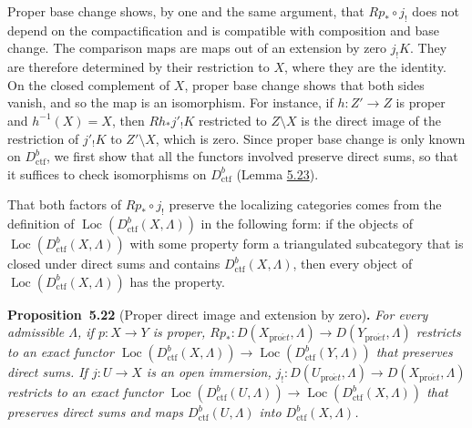 \documentclass[11pt]{article}
\newenvironment{bpstatement}[2]{\par\addvspace{0.6\baselineskip}\noindent\textbf{#1}#2\textbf{.}\enspace\ignorespaces}
  {\par\addvspace{0.4\baselineskip}}
\newenvironment{bpstatementit}[2]{\begin{bpstatement}{#1}{#2}\itshape\ignorespaces}{\end{bpstatement}}
\providecommand{\Loc}{}\renewcommand{\Loc}{\operatorname{Loc}}
\begin{document}
Proper base change shows, by one and the same argument, that \(Rp_*\circ j_!\) does not depend on the compactification and is compatible with composition and base change. The comparison maps are maps out of an extension by zero \(j_!K\). They are therefore determined by their restriction to \(X\), where they are the identity. On the closed complement of \(X\), proper base change shows that both sides vanish, and so the map is an isomorphism. For instance, if \(h:Z'\to Z\) is proper and \(h^{-1}(X)=X\), then \(Rh_*j'_!K\) restricted to \(Z\setminus X\) is the direct image of the restriction of \(j'_!K\) to \(Z'\setminus X\), which is zero. Since proper base change is only known on \(D^b_{\mathrm{ctf}}\), we first show that all the functors involved preserve direct sums, so that it suffices to check isomorphisms on \(D^b_{\mathrm{ctf}}\) (Lemma \hyperref[bp485]{5.23}).

That both factors of \(Rp_*\circ j_!\) preserve the localizing categories comes from the definition of \(\Loc(D^b_{\mathrm{ctf}}(X,\Lambda))\) in the following form: if the objects of \(\Loc(D^b_{\mathrm{ctf}}(X,\Lambda))\) with some property form a triangulated subcategory that is closed under direct sums and contains \(D^b_{\mathrm{ctf}}(X,\Lambda)\), then every object of \(\Loc(D^b_{\mathrm{ctf}}(X,\Lambda))\) has the property.

\label{bp482}%
\begin{bpstatementit}{Proposition~5.22}{ (Proper direct image and extension by zero)}
For every admissible \(\Lambda\), if \(p:X\to Y\) is proper, \(Rp_*:D(X_{\mathrm{pro}\acute{e}t},\Lambda)\to D(Y_{\mathrm{pro}\acute{e}t},\Lambda)\) restricts to an exact functor \(\Loc(D^b_{\mathrm{ctf}}(X,\Lambda))\to\Loc(D^b_{\mathrm{ctf}}(Y,\Lambda))\) that preserves direct sums. If \(j:U\to X\) is an open immersion, \(j_!:D(U_{\mathrm{pro}\acute{e}t},\Lambda)\to D(X_{\mathrm{pro}\acute{e}t},\Lambda)\) restricts to an exact functor \(\Loc(D^b_{\mathrm{ctf}}(U,\Lambda))\to\Loc(D^b_{\mathrm{ctf}}(X,\Lambda))\) that preserves direct sums and maps \(D^b_{\mathrm{ctf}}(U,\Lambda)\) into \(D^b_{\mathrm{ctf}}(X,\Lambda)\).
\end{bpstatementit}
\end{document}
